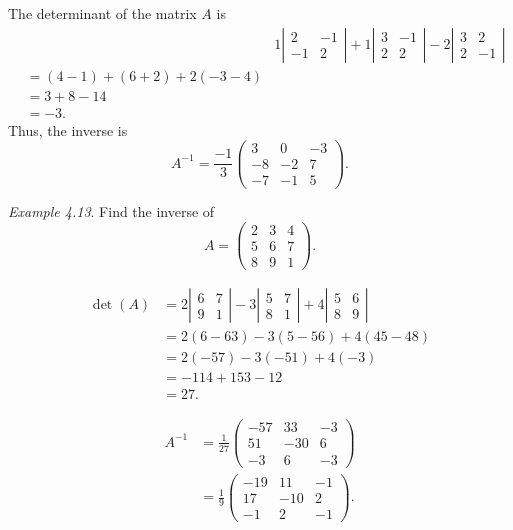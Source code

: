 \documentclass[
  letterpaper,
  DIV=11,
  numbers=noendperiod]{scrartcl}
\theoremstyle{remark}
\begin{document}
The determinant of the matrix \(A\) is \[\begin{aligned}
&&1\left|\begin{array}{rr}2 & -1 \\ -1 & 2\end{array}\right|+
1\left|\begin{array}{rr}3 & -1 \\ 2 & 2\end{array}\right|
-2\left|\begin{array}{rr}3 & 2 \\ 2 & -1\end{array}\right| \\
&= (4-1)+(6+2)+2(-3-4)\\
&= 3+8 -14\\
&=-3.
\end{aligned}\] Thus, the inverse is
\[A^{-1}=\frac{-1}{3}\left(\begin{array}{rrr}
3 & 0 & -3 \\
-8 & -2 & 7 \\
-7 & -1 & 5
\end{array}\right).\]

\emph{Example 4.13}. Find the inverse of \[A=\left(\begin{array}{rrr}
2 & 3 & 4 \\
5 & 6 & 7 \\
8 & 9 & 1
\end{array}\right).\]

\[\begin{aligned}
\det(A) &= 2\left|\begin{array}{rr}
6 & 7 \\
9 & 1
\end{array}\right|
-3\left|\begin{array}{rr}
5 & 7 \\
8 & 1
\end{array}\right|
+4\left|\begin{array}{rr}
5 & 6 \\
8 & 9
\end{array}\right| \\
&= 2(6-63)-3(5-56)+4(45-48) \\
&= 2(-57)-3(-51)+4(-3) \\
&= -114+153-12 \\
&= 27.
\end{aligned}\]

\[\begin{aligned}
A^{-1} &= \frac{1}{27}
\left(\begin{array}{rrr}
-57 & 33 & -3 \\
51 & -30 & 6 \\
-3 & 6 & -3
\end{array}\right) \\
&= \frac{1}{9}\left(\begin{array}{rrr}
-19 & 11 & -1 \\
17 & -10 & 2 \\
-1 & 2 & -1
\end{array}\right).
\end{aligned}\]
\end{document}
